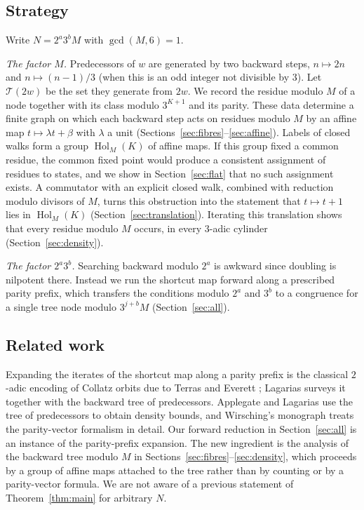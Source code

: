 \documentclass[11pt,reqno,oneside]{amsart}
\theoremstyle{plain}
\theoremstyle{definition}
\numberwithin{equation}{section}
\newcommand{\Tr}{\mathcal{T}}
\DeclareMathOperator{\Hol}{Hol}
\begin{document}
\subsection*{Strategy}
Write $N=2^a3^bM$ with $\gcd(M,6)=1$.

\smallskip\noindent\emph{The factor $M$.} Predecessors of $w$ are generated by two backward steps, $n\mapsto 2n$ and $n\mapsto (n-1)/3$ (when this is an odd integer not divisible by $3$). Let $\Tr(2w)$ be the set they generate from $2w$. We record the residue modulo $M$ of a node together with its class modulo $3^{K+1}$ and its parity. These data determine a finite graph on which each backward step acts on residues modulo $M$ by an affine map $t\mapsto \lambda t+\beta$ with $\lambda$ a unit (Sections~\ref{sec:fibres}--\ref{sec:affine}). Labels of closed walks form a group $\Hol_M(K)$ of affine maps. If this group fixed a common residue, the common fixed point would produce a consistent assignment of residues to states, and we show in Section~\ref{sec:flat} that no such assignment exists. A commutator with an explicit closed walk, combined with reduction modulo divisors of $M$, turns this obstruction into the statement that $t\mapsto t+1$ lies in $\Hol_M(K)$ (Section~\ref{sec:translation}). Iterating this translation shows that every residue modulo $M$ occurs, in every $3$-adic cylinder (Section~\ref{sec:density}).

\smallskip\noindent\emph{The factor $2^a3^b$.} Searching backward modulo $2^a$ is awkward since doubling is nilpotent there. Instead we run the shortcut map forward along a prescribed parity prefix, which transfers the conditions modulo $2^a$ and $3^b$ to a congruence for a single tree node modulo $3^{j+b}M$ (Section~\ref{sec:all}).

\subsection*{Related work}
Expanding the iterates of the shortcut map along a parity prefix is the classical $2$-adic encoding of Collatz orbits due to Terras \cite{Terras76} and Everett \cite{Everett77}; Lagarias \cite{Lagarias85} surveys it together with the backward tree of predecessors. Applegate and Lagarias \cite{ApplegateLagarias95} use the tree of predecessors to obtain density bounds, and Wirsching's monograph \cite{Wirsching98} treats the parity-vector formalism in detail. Our forward reduction in Section~\ref{sec:all} is an instance of the parity-prefix expansion. The new ingredient is the analysis of the backward tree modulo $M$ in Sections~\ref{sec:fibres}--\ref{sec:density}, which proceeds by a group of affine maps attached to the tree rather than by counting or by a parity-vector formula. We are not aware of a previous statement of Theorem~\ref{thm:main} for arbitrary $N$.
\end{document}
